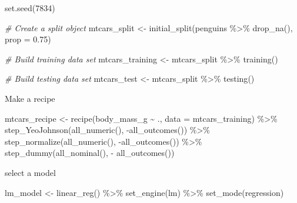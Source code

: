 \documentclass[
]{book}
\newenvironment{Shaded}{\begin{snugshade}}{\end{snugshade}}
\newcommand{\AttributeTok}[1]{\textcolor[rgb]{0.77,0.63,0.00}{#1}}
\newcommand{\CommentTok}[1]{\textcolor[rgb]{0.56,0.35,0.01}{\textit{#1}}}
\newcommand{\DecValTok}[1]{\textcolor[rgb]{0.00,0.00,0.81}{#1}}
\newcommand{\FloatTok}[1]{\textcolor[rgb]{0.00,0.00,0.81}{#1}}
\newcommand{\FunctionTok}[1]{\textcolor[rgb]{0.00,0.00,0.00}{#1}}
\newcommand{\NormalTok}[1]{#1}
\newcommand{\OtherTok}[1]{\textcolor[rgb]{0.56,0.35,0.01}{#1}}
\newcommand{\SpecialCharTok}[1]{\textcolor[rgb]{0.00,0.00,0.00}{#1}}
\newcommand{\StringTok}[1]{\textcolor[rgb]{0.31,0.60,0.02}{#1}}
\begin{document}
\begin{Shaded}
\begin{Highlighting}[]
\FunctionTok{set.seed}\NormalTok{(}\DecValTok{7834}\NormalTok{)}

\CommentTok{\# Create a split object}
\NormalTok{mtcars\_split }\OtherTok{\textless{}{-}} \FunctionTok{initial\_split}\NormalTok{(penguins }\SpecialCharTok{\%\textgreater{}\%}  \FunctionTok{drop\_na}\NormalTok{(), }\AttributeTok{prop =} \FloatTok{0.75}\NormalTok{)}

\CommentTok{\# Build training data set}
\NormalTok{mtcars\_training }\OtherTok{\textless{}{-}}\NormalTok{ mtcars\_split }\SpecialCharTok{\%\textgreater{}\%} 
                  \FunctionTok{training}\NormalTok{()}

\CommentTok{\# Build testing data set}
\NormalTok{mtcars\_test }\OtherTok{\textless{}{-}}\NormalTok{ mtcars\_split }\SpecialCharTok{\%\textgreater{}\%} 
              \FunctionTok{testing}\NormalTok{()}
\end{Highlighting}
\end{Shaded}

Make a recipe

\begin{Shaded}
\begin{Highlighting}[]
\NormalTok{mtcars\_recipe }\OtherTok{\textless{}{-}} \FunctionTok{recipe}\NormalTok{(body\_mass\_g }\SpecialCharTok{\textasciitilde{}}\NormalTok{ ., }\AttributeTok{data =}\NormalTok{ mtcars\_training) }\SpecialCharTok{\%\textgreater{}\%} 
                \FunctionTok{step\_YeoJohnson}\NormalTok{(}\FunctionTok{all\_numeric}\NormalTok{(), }\SpecialCharTok{{-}}\FunctionTok{all\_outcomes}\NormalTok{()) }\SpecialCharTok{\%\textgreater{}\%} 
                \FunctionTok{step\_normalize}\NormalTok{(}\FunctionTok{all\_numeric}\NormalTok{(), }\SpecialCharTok{{-}}\FunctionTok{all\_outcomes}\NormalTok{()) }\SpecialCharTok{\%\textgreater{}\%} 
                \FunctionTok{step\_dummy}\NormalTok{(}\FunctionTok{all\_nominal}\NormalTok{(), }\SpecialCharTok{{-}} \FunctionTok{all\_outcomes}\NormalTok{())}
\end{Highlighting}
\end{Shaded}

select a model

\begin{Shaded}
\begin{Highlighting}[]
\NormalTok{lm\_model }\OtherTok{\textless{}{-}} \FunctionTok{linear\_reg}\NormalTok{() }\SpecialCharTok{\%\textgreater{}\%} 
            \FunctionTok{set\_engine}\NormalTok{(}\StringTok{\textquotesingle{}lm\textquotesingle{}}\NormalTok{) }\SpecialCharTok{\%\textgreater{}\%} 
            \FunctionTok{set\_mode}\NormalTok{(}\StringTok{\textquotesingle{}regression\textquotesingle{}}\NormalTok{)}
\end{Highlighting}
\end{Shaded}
\end{document}
